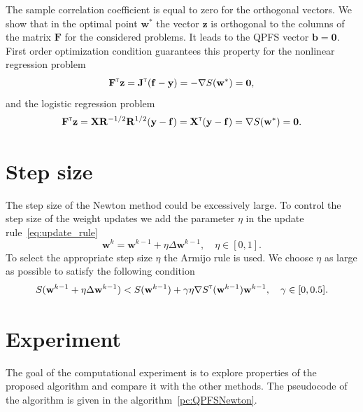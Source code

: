 \documentclass[a4paper,12pt]{article}
\theoremstyle{plain} %
\theoremstyle{definition} %
\theoremstyle{remark} %
\newcommand{\bb}{\mathbf{b}}
\newcommand{\bw}{\mathbf{w}}
\newcommand{\by}{\mathbf{y}}
\newcommand{\bz}{\mathbf{z}}
\newcommand{\bJ}{\mathbf{J}}
\newcommand{\bF}{\mathbf{F}}
\newcommand{\bR}{\mathbf{R}}
\newcommand{\bX}{\mathbf{X}}
\newcommand{\T}{{\text{\tiny\sffamily\upshape\mdseries T}}}
\begin{document}
  	The sample correlation coefficient is equal to zero for the orthogonal vectors.
  	We show that in the optimal point $\bw^*$ the vector $\bz$ is orthogonal to the columns of the matrix $\bF$ for the considered problems. 
  	It leads to the QPFS vector $\bb = \boldsymbol{0}$.
  	First order optimization condition guarantees this property for the nonlinear regression problem
	\[
		\bF^{\T} \bz = \bJ^{\T} (\mathbf{f} - \by) = - \nabla S(\bw^*) = \boldsymbol{0},
	\]
	and the logistic regression problem
	\[
		\bF^{\T} \bz = \bX \bR^{-1/2} \bR^{1/2} (\by - \mathbf{f}) = \bX^{\T} (\by - \mathbf{f}) = \nabla S(\bw^*) = \boldsymbol{0}.
	\]

	\section*{Step size}
	
	The step size of the Newton method could be excessively large. To control the step size of the weight updates we add the parameter $\eta$ in the update rule~\eqref{eq:update_rule}
	\[
		\bw^k = \bw^{k - 1} + \eta \Delta \bw^{k - 1}, \quad \eta \in [0, 1].
	\]
	To select the appropriate step size $\eta$ the Armijo rule is used. We choose $\eta$ as large as possible to satisfy the following condition
	\[
		S(\bw^{k - 1} + \eta \Delta \bw^{k - 1}) < S(\bw^{k - 1}) + \gamma \eta \nabla S^{\T}(\bw^{k-1})\bw^{k - 1}, \quad \gamma \in [0, 0.5].
	\]
	
  	\section*{Experiment}
  	The goal of the computational experiment is to explore properties of the proposed algorithm and compare it with the other methods. The pseudocode of the algorithm is given in the algorithm~\eqref{pc:QPFSNewton}.
  	
\end{document}
